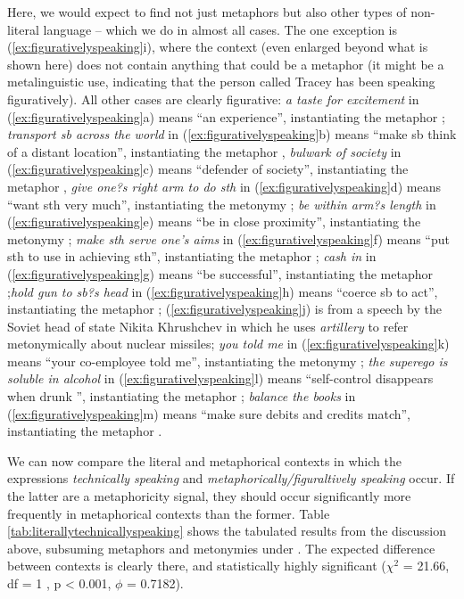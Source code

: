 Here, we would expect to find not just metaphors but also other types of non-literal language -- which we do in almost all cases. The one exception is (\ref{ex:figurativelyspeaking}i), where the context (even enlarged beyond what is shown here) does not contain anything that could be a metaphor (it might be a metalinguistic use, indicating that the person called Tracey has been speaking figuratively). All other cases are clearly figurative: \textit{a taste for excitement} in (\ref{ex:figurativelyspeaking}a) means ``an experience'', instantiating the metaphor ; \textit{transport sb across the world} in (\ref{ex:figurativelyspeaking}b) means ``make sb think of a distant location'', instantiating the metaphor , \textit{bulwark of society} in (\ref{ex:figurativelyspeaking}c) means ``defender of society'', instantiating the metaphor , \textit{give one?s right arm to do sth} in (\ref{ex:figurativelyspeaking}d) means ``want sth very much'', instantiating the metonymy ; \textit{be within arm?s length} in (\ref{ex:figurativelyspeaking}e) means ``be in close proximity'', instantiating the metonymy ; \textit{make sth serve one's aims} in (\ref{ex:figurativelyspeaking}f) means ``put sth to use in achieving sth'', instantiating the metaphor ; \textit{cash in} in (\ref{ex:figurativelyspeaking}g) means ``be successful'', instantiating the metaphor ;\textit{hold gun to sb?s head} in (\ref{ex:figurativelyspeaking}h) means ``coerce sb to act'', instantiating the metaphor ; (\ref{ex:figurativelyspeaking}j) is from a speech by the Soviet head of state Nikita Khrushchev in which he uses \textit{artillery} to refer metonymically about nuclear missiles; \textit{you told me} in (\ref{ex:figurativelyspeaking}k) means ``your co-employee told me'', instantiating the metonymy ; \textit{the superego is soluble in alcohol} in (\ref{ex:figurativelyspeaking}l) means ``self-control disappears when drunk '', instantiating the metaphor ; \textit{balance the books} in (\ref{ex:figurativelyspeaking}m) means ``make sure debits and credits match'', instantiating the metaphor .

We can now compare the literal and metaphorical contexts in which the expressions \textit{technically speaking} and \textit{metaphorically/figuraltively speaking} occur. If the latter are a metaphoricity signal, they should occur significantly more frequently in metaphorical contexts than the former. Table \ref{tab:literallytechnicallyspeaking} shows the tabulated results from the discussion above, subsuming metaphors and metonymies under . The expected difference between contexts is clearly there, and statistically highly significant ($\chi^2$ = 21.66, df =  1 , p < 0.001, $\phi$ = 0.7182).

